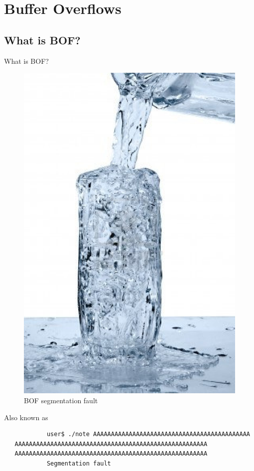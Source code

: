 \section{Buffer Overflows}

\subsection{What is BOF?}
\begin{frame}{What is BOF?}
	\begin{figure}
		\centering
		\includegraphics[height=.7\textheight]{imgs/segfault.png}
		\caption{BOF segmentation fault}
		\label{fig:segfault}
	\end{figure}
	\begin{block}{Also known as}
		\begin{verbatim}
			user$ ./note AAAAAAAAAAAAAAAAAAAAAAAAAAAAAAAAAAAAAAAAAAAA
   AAAAAAAAAAAAAAAAAAAAAAAAAAAAAAAAAAAAAAAAAAAAAAAAAAAAAA
   AAAAAAAAAAAAAAAAAAAAAAAAAAAAAAAAAAAAAAAAAAAAAAAAAAAAAA
			Segmentation fault
		\end{verbatim}
	\end{block}
\end{frame}
